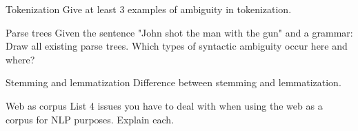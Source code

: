\documentclass{article}
\author{Leopold Lemmermann}
\begin{document}
\createtitle







\setcounter{section}{2022}
\begin{exercise}{Tokenization}
  Give at least 3 examples of ambiguity in tokenization.

  \begin{solution}
  \end{solution}
\end{exercise}

\begin{exercise}{Parse trees}
  Given the sentence "John shot the man with the gun" and a grammar: Draw all existing parse trees. Which types of syntactic ambiguity occur here and where?

  \begin{solution}
  \end{solution}
\end{exercise}

\begin{exercise}{Stemming and lemmatization}
  Difference between stemming and lemmatization.

  \begin{solution}
  \end{solution}
\end{exercise}

\begin{exercise}{Web as corpus}
  List 4 issues you have to deal with when using the web as a corpus for NLP purposes. Explain each.

  \begin{solution}
  \end{solution}
\end{exercise}
\end{document}

